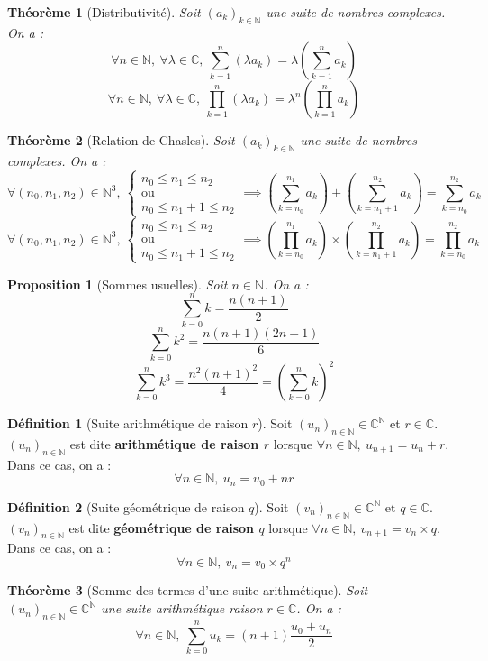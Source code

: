 \documentclass[french]{book}
\newcommand{\N}{\mathbb{N}}
\newcommand{\C}{\mathbb{C}}
\theoremstyle{plain}
\newtheorem{thm}{Théorème}[chapter]
\newtheorem{prop}{Proposition}[chapter]
\theoremstyle{definition}
\newtheorem{dfn}{Définition}[chapter]
\theoremstyle{remark}
\begin{document}
\begin{thm}[Distributivité]
	Soit $(a_k)_{k\in\N}$ une suite de nombres complexes. On a :$$\forall n\in\N,\ \forall\lambda\in\C,\ \sum_{k=1}^{n}(\lambda a_k)=\lambda\left(\sum_{k=1}^{n}a_k\right)$$
	$$\forall n\in\N,\ \forall\lambda\in\C,\ \prod_{k=1}^{n}(\lambda a_k)=\lambda^n\left(\prod_{k=1}^{n}a_k\right)$$
\end{thm}
\begin{thm}[Relation de Chasles]
	Soit $(a_k)_{k\in\N}$ une suite de nombres complexes. On a : $$\forall(n_0,n_1,n_2)\in\N^3,\ \begin{cases}
		n_0\leqslant n_1\leqslant n_2 \\ \text{ou}\\ n_0\leqslant n_1+1\leqslant n_2
	\end{cases}\implies \left(\sum_{k=n_0}^{n_1}a_k\right)+\left(\sum_{k=n_1+1}^{n_2}a_k\right)=\sum_{k=n_0}^{n_2}a_k$$
	$$\forall(n_0,n_1,n_2)\in\N^3,\ \begin{cases}
		n_0\leqslant n_1\leqslant n_2 \\ \text{ou}\\ n_0\leqslant n_1+1\leqslant n_2
	\end{cases}\implies \left(\prod_{k=n_0}^{n_1}a_k\right)\times\left(\prod_{k=n_1+1}^{n_2}a_k\right)=\prod_{k=n_0}^{n_2}a_k$$
\end{thm}
\begin{prop}[Sommes usuelles]
	Soit $n\in\N$. On a : $$\sum_{k=0}^{n}k=\frac{n(n+1)}{2}$$ $$\sum_{k=0}^{n}k^2=\frac{n(n+1)(2n+1)}{6}$$ $$\sum_{k=0}^{n}k^3=\frac{n^2(n+1)^2}{4}=\left(\sum_{k=0}^{n}k\right)^2$$
\end{prop}
\begin{dfn}[Suite arithmétique de raison $r$]
	Soit $(u_n)_{n\in\N}\in\C^\N$ et $r\in\C$. $(u_n)_{n\in\N}$ est dite \textbf{arithmétique de raison $r$} lorsque $\forall n\in\N,\ u_{n+1}=u_n+r$. Dans ce cas, on a : $$\forall n\in\N,\ u_n=u_0+nr$$
\end{dfn}
\begin{dfn}[Suite géométrique de raison $q$]
	Soit $(v_n)_{n\in\N}\in\C^\N$ et $q\in\C$. $(v_n)_{n\in\N}$ est dite \textbf{géométrique de raison $q$} lorsque $\forall n\in\N,\ v_{n+1}=v_n\times q$. Dans ce cas, on a : $$\forall n\in\N,\ v_n=v_0\times q^n$$
\end{dfn}
\begin{thm}[Somme des termes d'une suite arithmétique]
	Soit $(u_n)_{n\in\N}\in\C^\N$ une suite arithmétique raison $r\in\C$. On a : $$\forall n\in\N,\ \sum_{k=0}^{n}u_k=(n+1)\frac{u_0+u_n}{2}$$
\end{thm}
\end{document}
